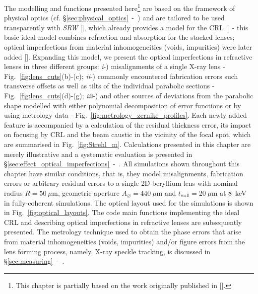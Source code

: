 \begin{refsection}
The modelling and functions presented here\footnote{This chapter is partially based on the work originally published in [\cite{Celestre2020b}].} are based on the framework of physical optics (cf. \S\ref{sec:physical_optics}~-~\textit{}) and are tailored to be used transparently with \textit{SRW} [\cite{Chubar1998}], which already provides a model for the CRL [\cite{Baltser2011}] - this basic ideal model combines refraction and absorption for the stacked lenses; optical imperfections from material inhomogeneities (voids, impurities) were later added [\cite{Roth2014}]. Expanding this model, we present the optical imperfections in refractive lenses in three different groups: \textit{i}-) misalignments of a single X-ray lens - Fig.~\ref{fig:lens_cuts}(b)-(c); \textit{ii}-) commonly encountered fabrication errors such transverse offsets as well as tilts of the individual parabolic sections - Fig.~\ref{fig:lens_cuts}(d)-(g); \textit{iii}-) and other sources of deviations from the parabolic shape modelled with either polynomial decomposition of error functions or by using metrology data - Fig.~\ref{fig:metrology_zernike_profiles}. Each newly added feature is accompanied by a calculation of the residual thickness error, its impact on focusing by CRL and the beam caustic in the vicinity of the focal spot, which are summarised in Fig.~\ref{fig:Strehl_m}. Calculations presented in this chapter are merely illustrative and a systematic evaluation is presented in \S\ref{sec:effect_optical_imperfections}~-~\textit{}. All simulations shown throughout this chapter have similar conditions, that is, they model misalignments, fabrication errors or arbitrary residual errors to a single 2D-beryllium lens with nominal radius $R=50~\mu\text{m}$, geometric aperture $A_{\diameter}=440~\mu\text{m}$ and $t_\text{wall}=20~\mu$m at 8~keV in fully-coherent simulations. The optical layout used for the simulations is shown in Fig.~\ref{fig:optical_layouts}. The code main functions implementing the ideal CRL and describing optical imperfections in refractive lenses are subsequently presented. The metrology technique used to obtain the phase errors that arise from material inhomogeneities (voids, impurities) and/or figure errors from the lens forming process, namely, X-ray speckle tracking, is discussed in \S\ref{sec:measuring}~-~\textit{}.


\end{refsection}
